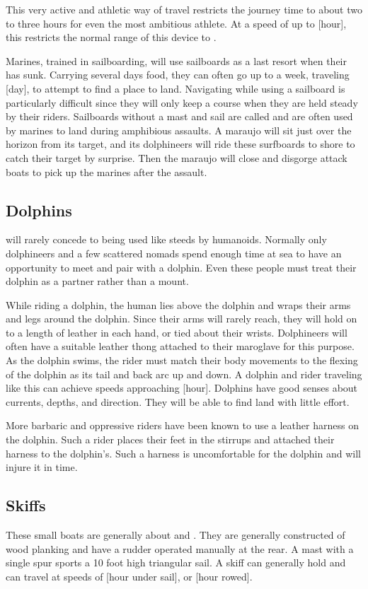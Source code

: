 \begin{multicols*}{2}
This very active and athletic way of travel restricts the journey time to about two to three hours for even the most ambitious athlete. At a speed of up to [hour], this restricts the normal range of this device to .

Marines, trained in sailboarding, will use sailboards as a last resort when their  has sunk. Carrying several days food, they can often go up to a week, traveling [day], to attempt to find a place to land. Navigating while using a sailboard is particularly difficult since they will only keep a course when they are held steady by their riders.
Sailboards without a mast and sail are called  and are often used by marines to land during amphibious assaults. A maraujo will sit just over the horizon from its target, and its dolphineers will ride these surfboards to shore to catch their target by surprise. Then the maraujo will close and disgorge attack boats to pick up the marines after the assault.
\subsection{Dolphins}
 will rarely concede to being used like steeds by humanoids. Normally only dolphineers and a few scattered nomads spend enough time at sea to have an opportunity to meet and pair with a dolphin. Even these people must treat their dolphin as a partner rather than a mount.

While riding a dolphin, the human lies above the dolphin and wraps their arms and legs around the dolphin. Since their arms will rarely reach, they will hold on to a length of leather in each hand, or tied about their wrists. Dolphineers will often have a suitable leather thong attached to their maroglave for this purpose. As the dolphin swims, the rider must match their body movements to the flexing of the dolphin as its tail and back arc up and down. A dolphin and rider traveling like this can achieve speeds approaching [hour]. Dolphins have good senses about currents, depths, and direction. They will be able to find land with little effort.

More barbaric and oppressive riders have been known to use a leather harness on the dolphin. Such a rider places their feet in the stirrups and attached their harness to the dolphin's. Such a harness is uncomfortable for the dolphin and will injure it in time.
\subsection{Skiffs}
These small boats are generally about  and . They are generally constructed of wood planking and have a rudder operated manually at the rear. A mast with a single spur sports a 10 foot high triangular sail. A skiff can generally hold  and can travel at speeds of [hour under sail], or [hour rowed].


\end{multicols*}
